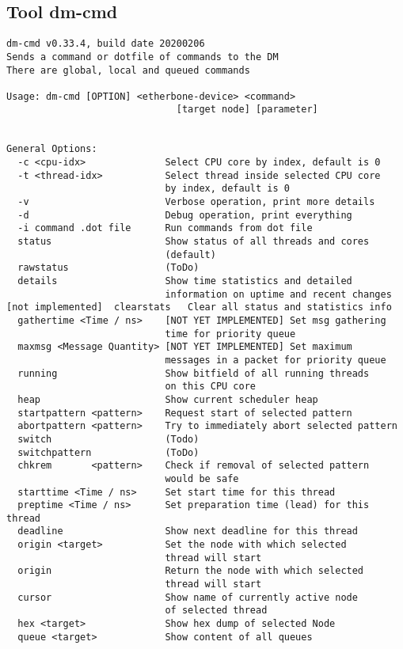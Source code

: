 \subsection{Tool dm-cmd}
\label{Tool_dm-cmd}
\begin{lstlisting}[style = helptext]
dm-cmd v0.33.4, build date 20200206
Sends a command or dotfile of commands to the DM
There are global, local and queued commands

Usage: dm-cmd [OPTION] <etherbone-device> <command> 
                              [target node] [parameter] 


General Options:
  -c <cpu-idx>              Select CPU core by index, default is 0
  -t <thread-idx>           Select thread inside selected CPU core
                            by index, default is 0
  -v                        Verbose operation, print more details
  -d                        Debug operation, print everything
  -i command .dot file      Run commands from dot file
  status                    Show status of all threads and cores 
                            (default)
  rawstatus                 (ToDo)
  details                   Show time statistics and detailed 
                            information on uptime and recent changes
[not implemented]  clearstats   Clear all status and statistics info
  gathertime <Time / ns>    [NOT YET IMPLEMENTED] Set msg gathering 
                            time for priority queue
  maxmsg <Message Quantity> [NOT YET IMPLEMENTED] Set maximum 
                            messages in a packet for priority queue
  running                   Show bitfield of all running threads 
                            on this CPU core
  heap                      Show current scheduler heap
  startpattern <pattern>    Request start of selected pattern
  abortpattern <pattern>    Try to immediately abort selected pattern
  switch                    (Todo)
  switchpattern             (ToDo)
  chkrem       <pattern>    Check if removal of selected pattern 
                            would be safe
  starttime <Time / ns>     Set start time for this thread
  preptime <Time / ns>      Set preparation time (lead) for this thread
  deadline                  Show next deadline for this thread
  origin <target>           Set the node with which selected 
                            thread will start
  origin                    Return the node with which selected 
                            thread will start
  cursor                    Show name of currently active node 
                            of selected thread
  hex <target>              Show hex dump of selected Node 
  queue <target>            Show content of all queues
\end{lstlisting}
